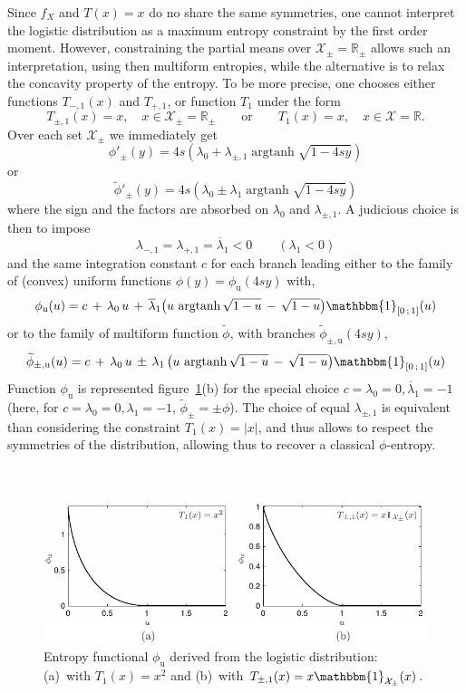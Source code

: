 \documentclass[entropy,article,submit,moreauthors,pdftex]{Definitions/mdpi}
\newcommand{\SZ}[1]{{\color{blue} #1}}
\def\Rset{\mathbb{R}}
\def\X{\mathcal{X}}
\def\un{\mathbbm{1}}
\def\argtanh{\operatorname{argtanh}}
\begin{document}
Since $f_X$ and $T(x) = x$ do no share the same symmetries, one cannot interpret
the logistic  distribution as a  maximum entropy  constraint by the  first order
moment. However, constraining the partial means over $\X_\pm = \Rset_\pm$ allows
such an interpretation, using then multiform entropies, while the alternative is
to relax the concavity property of the entropy.  To be more precise, one chooses
either functions $T_{-,1}(x)$ and $T_{+,1}$, or function $T_1$ under the form
%
\[
T_{\pm,1}(x) = x, \quad x \in  \X_\pm = \Rset_\pm \qquad \mbox{or} \qquad T_1(x)
= x,\quad x \in \X = \Rset.
\]
%
Over each set $\X_\pm$ we immediately get
\SZ{
%
\[
\phi'_\pm(y)  =  4 s  \left(  \lambda_0  + \lambda_{\pm,1}  \argtanh\sqrt{1-4sy}
\right)
\]
%
or
%
\[
\widetilde{\phi}'_\pm(y)    =   4    s    \left(    \lambda_0   \pm    \lambda_1
\argtanh\sqrt{1-4sy} \right)
\]
}
%
where   the   sign  and   the   factors   are   absorbed  on   $\lambda_0$   and
$\lambda_{\pm,1}$. A judicious choice is then to impose
%
\[
\lambda_{-,1} = \lambda_{+,1} = \overline{\lambda}_1 < 0 \qquad (\lambda_1 < 0)
\]
%
and the  same integration  constant $c$  for each branch  leading either  to the
family of (convex) uniform functions $\phi(y) = \phi_{\mathrm{u}}(4 s y)$ with,
%
\[
\phi_{\mathrm{u}}(u) =  c \, +  \, \lambda_0 \,  u \, +  \, \overline{\lambda}_1
\left( u \, \argtanh\sqrt{1-u} \, - \,  \sqrt{1-u} \right) \un_{\left[ 0 \, ; \,
    1 \right]}(u)
\]
%
or  to  the  family  of multiform  function  $\widetilde{\phi}$,  with  branches
$\widetilde{\phi}_{\pm,\mathrm{u}}(4 s y)$,
%
\[
\widetilde{\phi}_{\pm,\mathrm{u}}(u)  = c  \,  + \,  \lambda_0 \,  u  \, \pm  \,
\lambda_1  \,  \left(  u  \,  \argtanh\sqrt{1-u}  \,  -  \,  \sqrt{1-u}  \right)
\un_{\left[ 0 \, ; \, 1 \right]}(u)
\]
%
Function $\phi_{\mathrm{u}}$ is represented figure~\ref{fig:Entropy-logistic}(b)
for the special choice $c = \lambda_0 = 0, \overline{\lambda}_1 = -1$ (here, for
$c =  \lambda_0 = 0, \lambda_1  = -1$, $\widetilde{\phi}_\pm =  \pm \phi$).  The
choice of equal $\lambda_{\pm,1}$ is  equivalent than considering the constraint
$T_1(x) = |x|$,  and thus allows to respect the  symmetries of the distribution,
allowing thus to recover a classical $\phi$-entropy.

\

\begin{figure}[htbp]
\centerline{\includegraphics[width=.78\textwidth]{PDF/MaxEnt_LogisticLaw}}
\caption{Entropy  functional  $\phi_{\mathrm{u}}$   derived  from  the  logistic
  distribution:  (a)~with  $T_1(x)  =  x^2$   and  (b)~with  $T_{\pm,1}(x)  =  x
  \un_{\X_\pm}(x)$.}
\label{fig:Entropy-logistic}
\end{figure}
\end{document}
